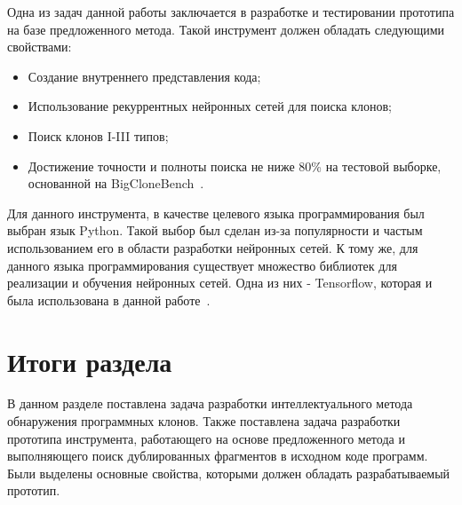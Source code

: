 Одна из задач данной работы заключается в разработке и тестировании прототипа на базе предложенного метода. Такой инструмент должен обладать следующими свойствами:
\begin{itemize}
\setlength\itemsep{0mm}
\item Создание внутреннего представления кода;
\item Использование рекуррентных нейронных сетей для поиска клонов;
\item Поиск клонов I-III типов;
\item Достижение точности и полноты поиска не ниже 80\% на тестовой выборке, основанной на BigCloneBench~\cite{bcb}.
\end{itemize}

Для данного инструмента, в качестве целевого языка программирования был выбран язык Python. Такой выбор был сделан из-за популярности и частым использованием его в области разработки нейронных сетей. К тому же, для данного языка программирования существует множество библиотек для реализации и обучения нейронных сетей. Одна из них - Tensorflow, которая и была использована в данной работе~\cite{tf}.

\section{Итоги раздела}

В данном разделе поставлена задача разработки интеллектуального метода обнаружения программных клонов. Также поставлена задача разработки прототипа инструмента, работающего на основе предложенного метода и выполняющего поиск дублированных фрагментов в исходном коде программ. Были выделены основные свойства, которыми должен обладать разрабатываемый прототип.
% 
% 

